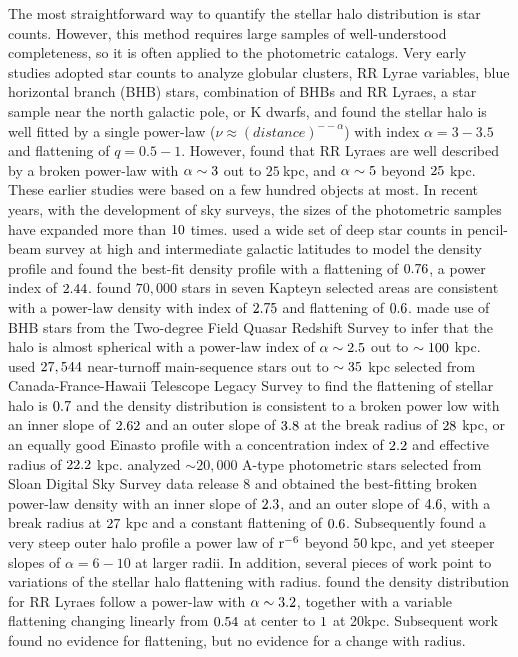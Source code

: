 \documentclass[12pt,preprint]{aastex}
\begin{document}
The most straightforward way to quantify the stellar halo distribution is star counts. However, this method requires large samples of well-understood completeness, so it is often applied to the photometric catalogs. Very early studies adopted star counts to analyze globular clusters\citep{Harris1976}, RR Lyrae variables\citep{Hawkins1984,Wetterer1996}, blue horizontal branch (BHB) stars\citep{Sommer-Larsen1987}, combination of BHBs and RR Lyraes\citep{Sluis1998}, a star sample near the north galactic pole\citep{Soubiran1993}, or K dwarfs\citep{Gould1998}, and found the stellar halo is well fitted by a single power-law ($\nu \approx (distance)^{−-\alpha}$) with index $\alpha=3-3.5$ and flattening of $q=0.5-1$. 
However, \citet{Saha1985} found that RR Lyraes are well described by a broken power-law with $\rm \alpha \sim 3$ out to $25~$kpc, and $\rm \alpha \sim 5$ beyond $\rm 25~$kpc.
These earlier studies were based on a few hundred objects at most. In recent years, with the development of sky surveys, the sizes of the photometric samples have expanded more than $\rm 10$ times. \citet{Robin2000} used a wide set of deep star counts in pencil-beam survey at high and intermediate galactic latitudes to model the density profile and found the best-fit density profile with a flattening of $\rm 0.76$, a power index of $\rm 2.44$. \citet{Siegel2002} found $70,000$ stars in seven Kapteyn selected areas are consistent with a power-law density with index of $\rm 2.75$ and flattening of $\rm 0.6$. \citet{Propris2010} made use of BHB stars from the Two-degree Field Quasar Redshift Survey to infer that the halo is almost spherical with a power-law index of $\rm \alpha \sim 2.5$ out to $\rm \sim 100~$kpc. \citet{Sesar2011} used $\rm 27,544$ near-turnoff main-sequence stars out to $\rm \sim 35~$kpc selected from Canada-France-Hawaii Telescope Legacy Survey to find the flattening of stellar halo is $\rm 0.7$ and the density distribution is consistent to a broken power low with an inner slope of $\rm 2.62$ and an outer slope of $\rm 3.8$ at the break radius of $\rm 28~$kpc, or an equally good Einasto profile\citep{Einasto1989} with a concentration index of $\rm 2.2$ and effective radius of $\rm 22.2~$kpc. \citet{Deason2011} analyzed $\sim 20,000$ A-type photometric stars selected from Sloan Digital Sky Survey data release 8\citep{Ahn2012} and obtained the best-fitting broken power-law density with an inner slope of $\rm 2.3$, and an outer slope of $\rm 4.6$, with a break radius at $\rm 27~$kpc and a constant flattening of $\rm 0.6$. Subsequently \citet{Deason2014} found a very steep outer halo profile a power law of  $\rm r^{-6}$ beyond $50~$kpc, and yet steeper slopes of $\alpha= 6-10$ at larger radii.
In addition, several pieces of work point to variations of the stellar halo flattening with radius. \citet{Preston1991} found the density distribution for RR Lyraes follow a power-law with $\rm \alpha \sim 3.2$, together with a variable flattening changing linearly from $\rm 0.54$ at center to $\rm 1$ at 20kpc. Subsequent work \citep{Sluis1998, Sesar2011,Deason2011} found no evidence for flattening, but no evidence for a change with radius.
\end{document}
